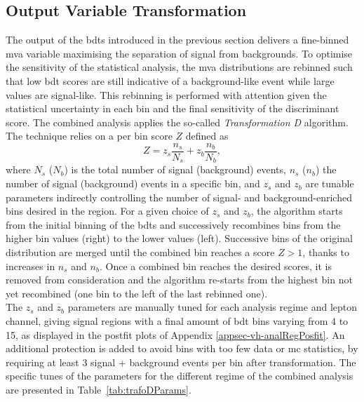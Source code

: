 \subsection{Output Variable Transformation}
The output of the \gls{bdt}s introduced in the previous section delivers a fine-binned \gls{mva} variable maximising the separation of signal from backgrounds. To optimise the sensitivity of the statistical analysis, the \gls{mva} distributions are rebinned such that low \gls{bdt} scores are still indicative of a background-like event while large values are signal-like. This rebinning is performed with attention given the statistical uncertainty in each bin and the final sensitivity of the discriminant score. The combined analysis applies  the so-called \textit{Transformation D} algorithm. The technique relies on a per bin score $Z$ defined as
\begin{equation}
    Z = z_s \frac{n_s}{N_s} + z_b \frac{n_b}{N_b},
\end{equation} 
where $N_s$ ($N_b$) is the total number of signal (background) events, $n_s$ ($n_b$) the number of signal (background) events in a specific bin, and $z_s$ and $z_b$ are tunable parameters indirectly controlling the number of signal- and background-enriched bins desired in the region. For a given choice of $z_s$ and $z_b$, the algorithm starts from the initial binning of the \gls{bdt}s and successively recombines bins from the higher bin values (right) to the lower values (left). Successive bins of the original distribution are merged until the combined bin reaches a score $Z > 1$, thanks to increases in $n_s$ and $n_b$. Once a combined bin reaches the desired scores, it is removed from consideration and the algorithm re-starts from the highest bin not yet recombined (one bin to the left of the last rebinned one).\\

The $z_s$ and $z_b$ parameters are manually tuned for each analysis regime and lepton channel, giving signal regions with a final amount of \gls{bdt} bins varying from 4 to 15, as displayed in the postfit plots of Appendix \ref{appsec-vh-analRegPosfit}. An additional protection is added to avoid bins with too few data or \gls{mc} statistics, by requiring at least 3 signal + background events per bin after transformation. The specific tunes of the parameters for the different regime of the combined analysis are presented in Table~\ref{tab:trafoDParams}.

